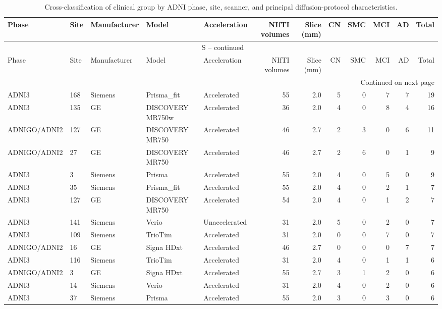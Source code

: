 \documentclass{article}
\renewcommand{\thetable}{S\arabic{table}}
\begin{document}
\begin{landscape}
\color{blue}
\scriptsize
\setlength{\tabcolsep}{2.5pt}
\begin{longtable}{lllllrrrrrrr}
\caption{Cross-classification of clinical group by ADNI phase, site, scanner, and principal diffusion-protocol characteristics.}\label{tab:acquisition_cells} \\
\toprule
Phase & Site & Manufacturer & Model & Acceleration & NIfTI volumes & Slice (mm) & CN & SMC & MCI & AD & Total \\
\midrule
\endfirsthead
\multicolumn{12}{c}{\tablename\ \thetable{} -- continued} \\
\toprule
Phase & Site & Manufacturer & Model & Acceleration & NIfTI volumes & Slice (mm) & CN & SMC & MCI & AD & Total \\
\midrule
\endhead
\midrule
\multicolumn{12}{r}{Continued on next page} \\
\endfoot
\bottomrule
\endlastfoot
ADNI3 & 168 & Siemens & Prisma\_fit & Accelerated & 55 & 2.0 & 5 & 0 & 7 & 7 & 19 \\
ADNI3 & 135 & GE & DISCOVERY MR750w & Accelerated & 36 & 2.0 & 4 & 0 & 8 & 4 & 16 \\
ADNIGO/ADNI2 & 127 & GE & DISCOVERY MR750 & Accelerated & 46 & 2.7 & 2 & 3 & 0 & 6 & 11 \\
ADNIGO/ADNI2 & 27 & GE & DISCOVERY MR750 & Accelerated & 46 & 2.7 & 2 & 6 & 0 & 1 & 9 \\
ADNI3 & 3 & Siemens & Prisma & Accelerated & 55 & 2.0 & 4 & 0 & 5 & 0 & 9 \\
ADNI3 & 35 & Siemens & Prisma\_fit & Accelerated & 55 & 2.0 & 4 & 0 & 2 & 1 & 7 \\
ADNI3 & 127 & GE & DISCOVERY MR750 & Accelerated & 54 & 2.0 & 4 & 0 & 1 & 2 & 7 \\
ADNI3 & 141 & Siemens & Verio & Unaccelerated & 31 & 2.0 & 5 & 0 & 2 & 0 & 7 \\
ADNI3 & 109 & Siemens & TrioTim & Accelerated & 31 & 2.0 & 0 & 0 & 7 & 0 & 7 \\
ADNIGO/ADNI2 & 16 & GE & Signa HDxt & Accelerated & 46 & 2.7 & 0 & 0 & 0 & 7 & 7 \\
ADNI3 & 116 & Siemens & TrioTim & Accelerated & 31 & 2.0 & 4 & 0 & 1 & 1 & 6 \\
ADNIGO/ADNI2 & 3 & GE & Signa HDxt & Accelerated & 55 & 2.7 & 3 & 1 & 2 & 0 & 6 \\
ADNI3 & 14 & Siemens & Verio & Accelerated & 31 & 2.0 & 4 & 0 & 2 & 0 & 6 \\
ADNI3 & 37 & Siemens & Prisma & Accelerated & 55 & 2.0 & 3 & 0 & 3 & 0 & 6 \\

\end{longtable}
\end{landscape}
\end{document}
